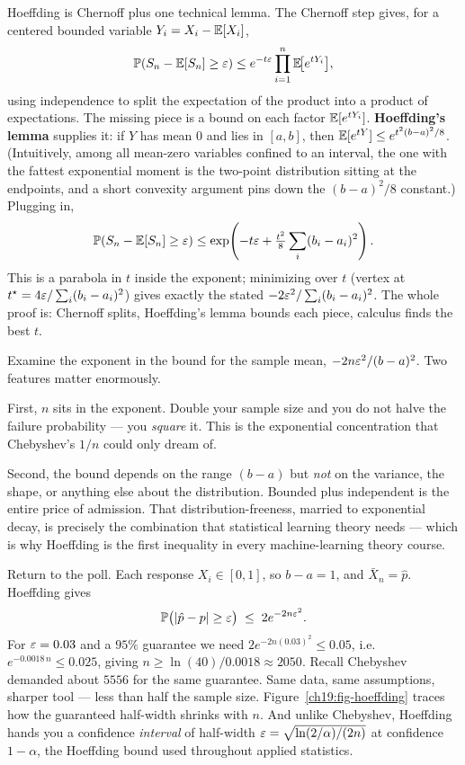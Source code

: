 \begin{whybox}
Hoeffding is Chernoff plus one technical lemma. The Chernoff step gives, for a
centered bounded variable $Y_i = X_i - \operatorname{\mathbb{E}}[X_i]$,
\[
  \operatorname{\mathbb{P}}(S_n - \operatorname{\mathbb{E}}[S_n] \ge \varepsilon)
  \le e^{-t\varepsilon}\prod_{i=1}^n \operatorname{\mathbb{E}}\!\bigl[e^{tY_i}\bigr],
\]
using independence to split the expectation of the product into a product of
expectations. The missing piece is a bound on each factor $\operatorname{\mathbb{E}}[e^{tY_i}]$.
\textbf{Hoeffding's lemma} supplies it: if $Y$ has mean $0$ and lies in
$[a,b]$, then $\operatorname{\mathbb{E}}[e^{tY}] \le e^{t^2(b-a)^2/8}$. (Intuitively, among all
mean-zero variables confined to an interval, the one with the fattest
exponential moment is the two-point distribution sitting at the endpoints,
and a short convexity argument pins down the $(b-a)^2/8$ constant.) Plugging
in,
\[
  \operatorname{\mathbb{P}}(S_n - \operatorname{\mathbb{E}}[S_n] \ge \varepsilon)
  \le \exp\!\left(-t\varepsilon + \tfrac{t^2}{8}\sum_i (b_i-a_i)^2\right).
\]
This is a parabola in $t$ inside the exponent; minimizing over $t$ (vertex at
$t^\star = 4\varepsilon/\sum_i (b_i-a_i)^2$) gives exactly the stated
$-2\varepsilon^2/\sum_i(b_i-a_i)^2$. The whole proof is: Chernoff splits, Hoeffding's
lemma bounds each piece, calculus finds the best $t$.
\end{whybox}

\begin{happeningbox}
Examine the exponent in the bound for the sample mean, $-2n\varepsilon^2/(b-a)^2$. Two features
matter enormously.

First, $n$ sits in the exponent. Double your sample size and you do not halve
the failure probability --- you \emph{square} it. This is the exponential
concentration that Chebyshev's $1/n$ could only dream of.

Second, the bound depends on the range $(b-a)$ but \emph{not} on the variance,
the shape, or anything else about the distribution. Bounded plus independent is
the entire price of admission. That distribution-freeness, married to
exponential decay, is precisely the combination that statistical learning
theory needs --- which is why Hoeffding is the first inequality in every
machine-learning theory course.
\end{happeningbox}

\begin{example}
\label{ch19:ex-poll-sharp}
Return to the poll. Each response $X_i \in [0,1]$, so $b-a = 1$, and
$\bar X_n = \hat p$. Hoeffding gives
\[
  \operatorname{\mathbb{P}}\bigl(\lvert\hat p - p\rvert \ge \varepsilon\bigr)
  \;\le\; 2 e^{-2n\varepsilon^2}.
\]
For $\varepsilon = 0.03$ and a $95\%$ guarantee we need $2e^{-2n(0.03)^2} \le 0.05$,
i.e.\ $e^{-0.0018\,n} \le 0.025$, giving
$n \ge \ln(40)/0.0018 \approx 2050$. Recall Chebyshev demanded about
$5556$ for the same guarantee. Same data, same assumptions, sharper tool ---
less than half the sample size. Figure~\ref{ch19:fig-hoeffding} traces how the
guaranteed half-width shrinks with $n$. And unlike Chebyshev, Hoeffding hands you a
confidence \emph{interval} of half-width $\varepsilon = \sqrt{\ln(2/\alpha)/(2n)}$ at
confidence $1-\alpha$, the Hoeffding bound used throughout applied statistics.
\end{example}

